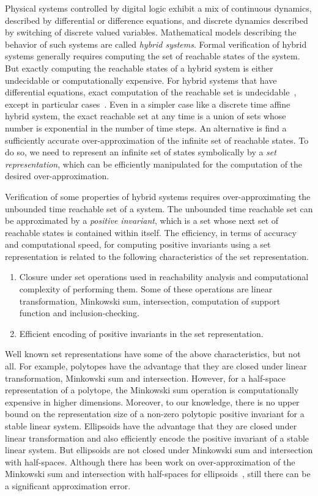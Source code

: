 
Physical systems controlled by digital logic exhibit a mix of
continuous dynamics, described by differential or difference
equations, and discrete dynamics described by switching of discrete
valued variables.  Mathematical models describing the behavior of such
systems are called \emph{hybrid systems}.  Formal verification of
hybrid systems generally requires computing the set of reachable
states of the system.  But exactly computing the reachable states of a
hybrid system is either undecidable or computationally expensive.  For
hybrid systems that have differential equations, exact computation of
the reachable set is undecidable~\cite{alur1995algorithmic}, except in
particular cases~\cite{lafferriere1998decidable}.  Even in a simpler
case like a discrete time affine hybrid system, the exact reachable
set at any time is a union of sets whose number is exponential in the
number of time steps.  An alternative is find a sufficiently accurate
over-approximation of the infinite set of reachable states.  To do so,
we need to represent an infinite set of states symbolically by a {\it
set representation}, which can be efficiently manipulated for the
computation of the desired over-approximation.


Verification of some properties of hybrid systems requires
over-approximating the unbounded time reachable set of a system.  The
unbounded time reachable set can be approximated by a \emph{positive
invariant}, which is a set whose next set of reachable states is
contained within itself.  The efficiency, in terms of accuracy and
computational speed, for computing positive invariants using a set
representation is related to the following characteristics of the set
representation.
%
\begin{enumerate}
\item Closure under set operations used in reachability analysis and computational complexity of
performing them.  Some of these operations are linear transformation,
Minkowski sum, intersection, computation of support function and
inclusion-checking.
\item Efficient encoding of positive invariants in the set representation.
\end{enumerate}
%
Well known set representations have some of the above characteristics,
but not all.  For example, polytopes have the advantage that they are
closed under linear transformation, Minkowski sum and intersection.
However, for a half-space representation of a polytope, the Minkowski
sum operation is computationally expensive in higher dimensions.
Moreover, to our knowledge, there is no upper bound on the
representation size of a non-zero polytopic positive invariant for a
stable linear system.  Ellipsoids have the advantage that they are
closed under linear transformation and also efficiently encode the
positive invariant of a stable linear system.  But ellipsoids are not
closed under Minkowski sum and intersection with half-spaces.
Although there has been work on over-approximation of the Minkowski
sum and intersection with half-spaces for
ellipsoids~\cite{allamigeon2017fast,kurzhanskiy2006ellipsoidal}, still there can be a significant
approximation error.

